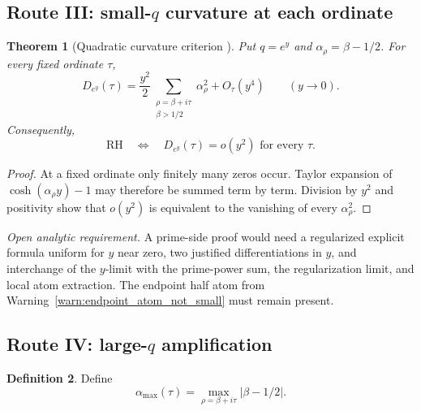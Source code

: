 \documentclass[11pt]{amsart}
\numberwithin{equation}{section}
\theoremstyle{plain}
\newtheorem{theorem}{Theorem}[section]
\theoremstyle{definition}
\newtheorem{definition}[theorem]{Definition}
\theoremstyle{remark}
\newcommand{\RH}{\mathrm{RH}}
\newcommand{\1}{\mathbf{1}}
\begin{document}
\subsection{Route III: small-\texorpdfstring{\(q\)}{q} curvature at each ordinate}
\label{subsec:route_small_q}


\begin{theorem}[Quadratic curvature criterion {}]
\label{thm:small_q_curvature}
Put $q=e^y$ and $\alpha_\rho=\beta-1/2$.  For every fixed ordinate $\tau$,
\begin{equation}
D_{e^y}(\tau)
=
\frac{y^2}{2}
\sum_{\substack{\rho=\beta+i\tau\\\beta>1/2}}
\alpha_\rho^2
+O_\tau(y^4)
\qquad(y\to0).
\label{eq:small_q_curvature_expansion}
\end{equation}
Consequently,
\begin{equation}
\RH
\quad\Longleftrightarrow\quad
D_{e^y}(\tau)=o(y^2)
\text{ for every }\tau.
\label{eq:small_q_curvature_criterion}
\end{equation}
\end{theorem}

\begin{proof}
At a fixed ordinate only finitely many zeros occur.  Taylor expansion of
$\cosh(\alpha_\rho y)-1$ may therefore be summed term by term.  Division by
$y^2$ and positivity show that $o(y^2)$ is equivalent to the vanishing of
every $\alpha_\rho^2$.
\end{proof}

\medskip\noindent\emph{Open analytic requirement.} A prime-side proof would need a regularized explicit formula
uniform for $y$ near zero, two justified differentiations in $y$, and
interchange of the $y$-limit with the prime-power sum, the regularization
limit, and local atom extraction.  The endpoint half atom from
Warning~\ref{warn:endpoint_atom_not_small} must remain present.

\subsection{Route IV: large-\texorpdfstring{\(q\)}{q} amplification}
\label{subsec:route_large_q}


\begin{definition}
\label{def:max_horizontal_displacement}
Define
\begin{equation}
\alpha_{\max}(\tau)
=
\max_{\rho=\beta+i\tau}|\beta-1/2|.
\label{eq:max_horizontal_displacement}
\end{equation}
\end{definition}
\end{document}
